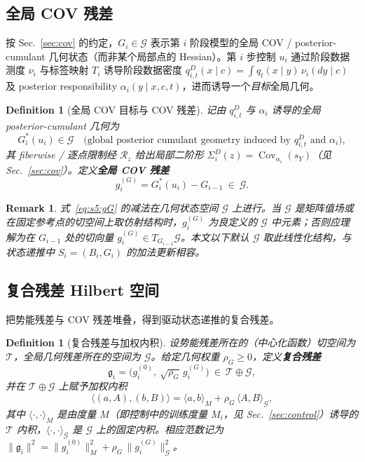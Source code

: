 \documentclass[11pt,a4paper]{article}
\newtheorem{definition}[theorem]{Definition}
\newtheorem{remark}[theorem]{Remark}
\DeclareMathOperator{\Cov}{Cov}
\newcommand{\cG}{\mathcal{G}}   %
\newcommand{\cT}{\mathcal{T}}   %
\newcommand{\Rstr}{\mathcal{R}}     %
\newcommand{\gres}{\bm{\mathfrak{g}}} %
\begin{document}
\subsection{全局 COV 残差}

按 Sec.~\ref{sec:cov} 的约定，$G_i\in\cG$ 表示第 $i$ 阶段模型的全局 COV / posterior-cumulant 几何状态（而非某个局部点的 Hessian）。第 $i$ 步控制 $u_i$ 通过阶段数据测度 $\nu_i$ 与标签映射 $T_i$ 诱导阶段数据密度 $q_{i,t}^D(x\mid c)=\int q_t(x\mid y)\,\nu_i(dy\mid c)$ 及 posterior responsibility $\alpha_i(y\mid x,c,t)$，进而诱导一个\emph{目标}全局几何。

\begin{definition}[全局 COV 目标与 COV 残差]\label{def:s5:Gtarget}
记由 $q_{i,t}^D$ 与 $\alpha_i$ 诱导的全局 posterior-cumulant 几何为
\begin{equation}\label{eq:s5:Gstar}
G_i^*(u_i)\in\cG
\quad\text{(global posterior cumulant geometry induced by }q_{i,t}^D\text{ and }\alpha_i\text{)},
\end{equation}
其 fiberwise / 逐点限制经 $\Rstr_z$ 给出局部二阶形 $\Sigma_i^D(z)=\Cov_{\alpha_i}(s_Y)$（见 Sec.~\ref{sec:cov}）。定义\textbf{全局 COV 残差}
\begin{equation}\label{eq:s5:gG}
g_i^{(G)}=G_i^*(u_i)-G_{i-1}\ \in\ \cG.
\end{equation}
\end{definition}

\begin{remark}\label{rem:s5:Glin}
式~\eqref{eq:s5:gG} 的减法在几何状态空间 $\cG$ 上进行。当 $\cG$ 是矩阵值场或在固定参考点的切空间上取仿射结构时，$g_i^{(G)}$ 为良定义的 $\cG$ 中元素；否则应理解为在 $G_{i-1}$ 处的切向量 $g_i^{(G)}\in T_{G_{i-1}}\cG$。本文以下默认 $\cG$ 取此线性化结构，与状态递推中 $S_i=(B_i,G_i)$ 的加法更新相容。
\end{remark}

\subsection{复合残差 Hilbert 空间}

把势能残差与 COV 残差堆叠，得到驱动状态递推的复合残差。

\begin{definition}[复合残差与加权内积]\label{def:s5:composite}
设势能残差所在的（中心化函数）切空间为 $\cT$，全局几何残差所在的空间为 $\cG$。给定几何权重 $\rho_G\ge 0$，定义\textbf{复合残差}
\begin{equation}\label{eq:s5:gres}
\gres_i=\big(g_i^{(0)},\ \sqrt{\rho_G}\,g_i^{(G)}\big)\ \in\ \cT\oplus\cG,
\end{equation}
并在 $\cT\oplus\cG$ 上赋予加权内积
\begin{equation}\label{eq:s5:inner}
\big\langle (a,A),(b,B)\big\rangle
=\langle a,b\rangle_{M}+\rho_G\,\langle A,B\rangle_{\cG},
\end{equation}
其中 $\langle\cdot,\cdot\rangle_{M}$ 是由度量 $M$（即控制中的训练度量 $M_i$，见 Sec.~\ref{sec:control}）诱导的 $\cT$ 内积，$\langle\cdot,\cdot\rangle_{\cG}$ 是 $\cG$ 上的固定内积。相应范数记为 $\|\gres_i\|^2=\|g_i^{(0)}\|_M^2+\rho_G\,\|g_i^{(G)}\|_{\cG}^2$。
\end{definition}
\end{document}
